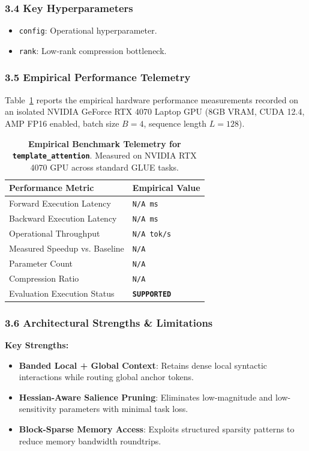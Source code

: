 \subsubsection*{3.4 Key Hyperparameters}
\begin{itemize}
    \item \texttt{config}: Operational hyperparameter.
    \item \texttt{rank}: Low-rank compression bottleneck.
\end{itemize}

\subsubsection*{3.5 Empirical Performance Telemetry}
Table~\ref{tab:telemetry_template_attention} reports the empirical hardware performance measurements recorded on an isolated NVIDIA GeForce RTX 4070 Laptop GPU (8GB VRAM, CUDA 12.4, AMP FP16 enabled, batch size $B=4$, sequence length $L=128$).

\begin{table}[h]
\centering
\small
\caption{\textbf{Empirical Benchmark Telemetry for \texttt{template\_attention}}. Measured on NVIDIA RTX 4070 GPU across standard GLUE tasks.}
\label{tab:telemetry_template_attention}
\begin{tabularx}{\columnwidth}{lX}
\toprule
\textbf{Performance Metric} & \textbf{Empirical Value} \\
\midrule
Forward Execution Latency & \texttt{N/A ms} \\
Backward Execution Latency & \texttt{N/A ms} \\
Operational Throughput & \texttt{N/A tok/s} \\
Measured Speedup vs. Baseline & \texttt{N/A} \\
Parameter Count & \texttt{N/A} \\
Compression Ratio & \texttt{N/A} \\
Evaluation Execution Status & \textbf{\texttt{SUPPORTED}} \\
\bottomrule
\end{tabularx}
\end{table}

\subsubsection*{3.6 Architectural Strengths \& Limitations}
\textbf{Key Strengths:}
\begin{itemize}
    \item \textbf{Banded Local + Global Context}: Retains dense local syntactic interactions while routing global anchor tokens.
    \item \textbf{Hessian-Aware Salience Pruning}: Eliminates low-magnitude and low-sensitivity parameters with minimal task loss.
    \item \textbf{Block-Sparse Memory Access}: Exploits structured sparsity patterns to reduce memory bandwidth roundtrips.
\end{itemize}

